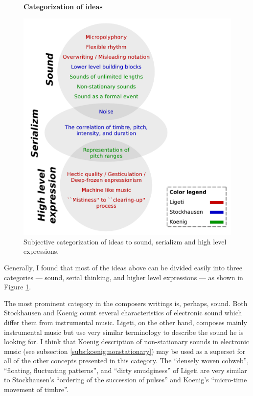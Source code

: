 \documentclass[a4paper,11pt]{article}
\begin{document}
\begin{figure}[!htb]
  \centering
  \textbf{Categorization of ideas}\par\medskip
  \includegraphics[width=\linewidth]{graphics/concepts_categorization.pdf}
  \caption{Subjective categorization of ideas to sound, serializm and high level expressions.}
  \label{fig:concepts_categorization}
\end{figure}

Generally, I found that most of the ideas above can be divided easily into three categories --- sound, serial thinking, and higher level expressions --- as shown in Figure \ref{fig:concepts_categorization}.

The most prominent category in the composers writings is, perhaps, sound.
Both Stockhausen and Koenig count several characteristics of electronic sound which differ them from instrumental music.
Ligeti, on the other hand, composes mainly instrumental music but use very similar terminology to describe the sound he is looking for.
I think that Koenig description of non-stationary sounds in electronic music (see subsection \ref{subs:koenig:nonstationary}) may be used as a superset for all of the other concepts presented in this category.
The ``densely woven cobweb'', ``floating, fluctuating patterns'', and ``dirty smudginess'' of Ligeti are very similar to Stockhausen's ``ordering of the succession of pulses'' and Koenig's ``micro-time movement of timbre''.
\end{document}
